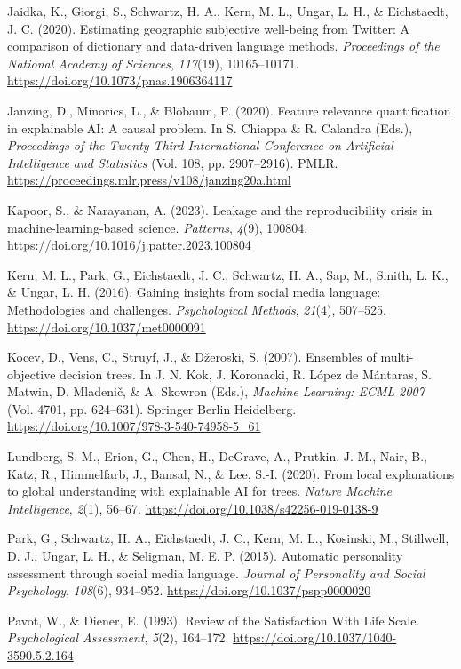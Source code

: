 \documentclass[11pt,letterpaper]{article}
\newcommand{\APAref}{\par\noindent\hangindent=0.5in\hangafter=1\relax}
\begin{document}
\APAref Jaidka, K., Giorgi, S., Schwartz, H. A., Kern, M. L., Ungar, L. H., \& Eichstaedt, J. C. (2020). Estimating geographic subjective well-being from Twitter: A comparison of dictionary and data-driven language methods. \emph{Proceedings of the National Academy of Sciences}, \emph{117}(19), 10165--10171. \url{https://doi.org/10.1073/pnas.1906364117}

\APAref Janzing, D., Minorics, L., \& Blöbaum, P. (2020). Feature relevance quantification in explainable AI: A causal problem. In S. Chiappa \& R. Calandra (Eds.), \emph{Proceedings of the Twenty Third International Conference on Artificial Intelligence and Statistics} (Vol. 108, pp. 2907--2916). PMLR. \url{https://proceedings.mlr.press/v108/janzing20a.html}

\APAref Kapoor, S., \& Narayanan, A. (2023). Leakage and the reproducibility crisis in machine-learning-based science. \emph{Patterns}, \emph{4}(9), 100804. \url{https://doi.org/10.1016/j.patter.2023.100804}

\APAref Kern, M. L., Park, G., Eichstaedt, J. C., Schwartz, H. A., Sap, M., Smith, L. K., \& Ungar, L. H. (2016). Gaining insights from social media language: Methodologies and challenges. \emph{Psychological Methods}, \emph{21}(4), 507--525. \url{https://doi.org/10.1037/met0000091}

\APAref Kocev, D., Vens, C., Struyf, J., \& Džeroski, S. (2007). Ensembles of multi-objective decision trees. In J. N. Kok, J. Koronacki, R. López de Mántaras, S. Matwin, D. Mladenič, \& A. Skowron (Eds.), \emph{Machine Learning: ECML 2007} (Vol. 4701, pp. 624--631). Springer Berlin Heidelberg. \url{https://doi.org/10.1007/978-3-540-74958-5_61}

\APAref Lundberg, S. M., Erion, G., Chen, H., DeGrave, A., Prutkin, J. M., Nair, B., Katz, R., Himmelfarb, J., Bansal, N., \& Lee, S.-I. (2020). From local explanations to global understanding with explainable AI for trees. \emph{Nature Machine Intelligence}, \emph{2}(1), 56--67. \url{https://doi.org/10.1038/s42256-019-0138-9}

\APAref Park, G., Schwartz, H. A., Eichstaedt, J. C., Kern, M. L., Kosinski, M., Stillwell, D. J., Ungar, L. H., \& Seligman, M. E. P. (2015). Automatic personality assessment through social media language. \emph{Journal of Personality and Social Psychology}, \emph{108}(6), 934--952. \url{https://doi.org/10.1037/pspp0000020}

\APAref Pavot, W., \& Diener, E. (1993). Review of the Satisfaction With Life Scale. \emph{Psychological Assessment}, \emph{5}(2), 164--172. \url{https://doi.org/10.1037/1040-3590.5.2.164}
\end{document}
